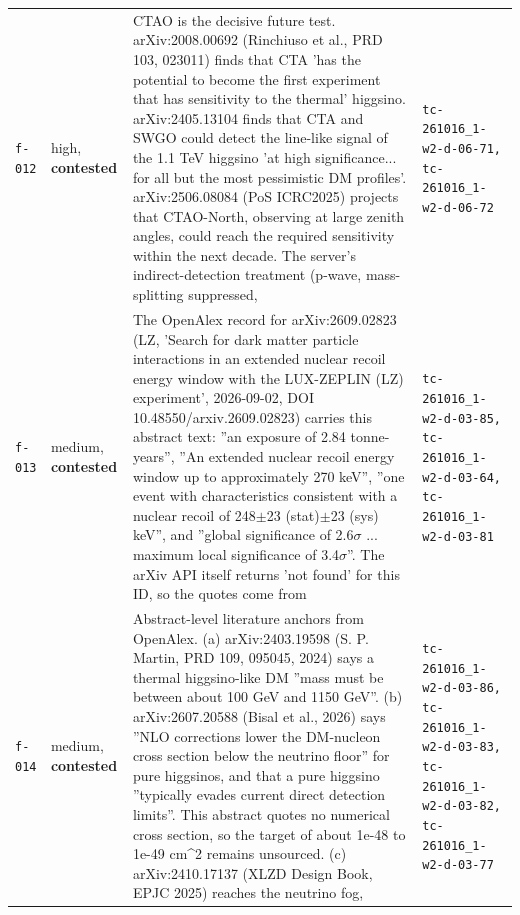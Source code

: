 \documentclass[11pt,a4paper]{article}
\begin{document}
\begin{longtable}{@{}p{}p{}p{}p{}@{}}
\texttt{f-012} & high, \textbf{contested} & CTAO is the decisive future test. arXiv:2008.00692 (Rinchiuso et al., PRD 103, 023011) finds that CTA 'has the potential to become the first experiment that has sensitivity to the thermal' higgsino. arXiv:2405.13104 finds that CTA and SWGO could detect the line-like signal of the 1.1 TeV higgsino 'at high significance... for all but the most pessimistic DM profiles'. arXiv:2506.08084 (PoS ICRC2025) projects that CTAO-North, observing at large zenith angles, could reach the required sensitivity within the next decade. The server's indirect-detection treatment (p-wave, mass-splitting suppressed, & \texttt{tc-261016\_\allowbreak{}1-w2-d-06-71,\allowbreak{} tc-261016\_\allowbreak{}1-w2-d-06-72} \\
\texttt{f-013} & medium, \textbf{contested} & The OpenAlex record for arXiv:2609.02823 (LZ, 'Search for dark matter particle interactions in an extended nuclear recoil energy window with the LUX-ZEPLIN (LZ) experiment', 2026-09-02, DOI 10.48550/arxiv.2609.02823) carries this abstract text: ''an exposure of 2.84 tonne-years'', ''An extended nuclear recoil energy window up to approximately 270 keV'', ''one event with characteristics consistent with a nuclear recoil of 248$\pm$23 (stat)$\pm$23 (sys) keV'', and ''global significance of 2.6$\sigma$ ... maximum local significance of 3.4$\sigma$''. The arXiv API itself returns 'not found' for this ID, so the quotes come from & \texttt{tc-261016\_\allowbreak{}1-w2-d-03-85,\allowbreak{} tc-261016\_\allowbreak{}1-w2-d-03-64,\allowbreak{} tc-261016\_\allowbreak{}1-w2-d-03-81} \\
\texttt{f-014} & medium, \textbf{contested} & Abstract-level literature anchors from OpenAlex. (a) arXiv:2403.19598 (S. P. Martin, PRD 109, 095045, 2024) says a thermal higgsino-like DM ''mass must be between about 100 GeV and 1150 GeV''. (b) arXiv:2607.20588 (Bisal et al., 2026) says ''NLO corrections lower the DM-nucleon cross section below the neutrino floor'' for pure higgsinos, and that a pure higgsino ''typically evades current direct detection limits''. This abstract quotes no numerical cross section, so the target of about 1e-48 to 1e-49 cm\textasciicircum{}2 remains unsourced. (c) arXiv:2410.17137 (XLZD Design Book, EPJC 2025) reaches the neutrino fog, & \texttt{tc-261016\_\allowbreak{}1-w2-d-03-86,\allowbreak{} tc-261016\_\allowbreak{}1-w2-d-03-83,\allowbreak{} tc-261016\_\allowbreak{}1-w2-d-03-82,\allowbreak{} tc-261016\_\allowbreak{}1-w2-d-03-77} \\
\bottomrule\end{longtable}
\end{document}
